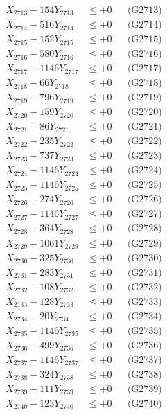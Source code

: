 \documentclass[a4paper,10pt]{article}
\begin{document}
{\begin{align}
X_{2713} - 154Y_{2713} &\leq +0 && \text{(G2713)} \\
X_{2714} - 516Y_{2714} &\leq +0 && \text{(G2714)} \\
X_{2715} - 152Y_{2715} &\leq +0 && \text{(G2715)} \\
X_{2716} - 580Y_{2716} &\leq +0 && \text{(G2716)} \\
X_{2717} - 1146Y_{2717} &\leq +0 && \text{(G2717)} \\
X_{2718} - 66Y_{2718} &\leq +0 && \text{(G2718)} \\
X_{2719} - 796Y_{2719} &\leq +0 && \text{(G2719)} \\
X_{2720} - 159Y_{2720} &\leq +0 && \text{(G2720)} \\
\allowbreak
X_{2721} - 86Y_{2721} &\leq +0 && \text{(G2721)} \\
X_{2722} - 235Y_{2722} &\leq +0 && \text{(G2722)} \\
X_{2723} - 737Y_{2723} &\leq +0 && \text{(G2723)} \\
X_{2724} - 1146Y_{2724} &\leq +0 && \text{(G2724)} \\
X_{2725} - 1146Y_{2725} &\leq +0 && \text{(G2725)} \\
X_{2726} - 274Y_{2726} &\leq +0 && \text{(G2726)} \\
X_{2727} - 1146Y_{2727} &\leq +0 && \text{(G2727)} \\
X_{2728} - 364Y_{2728} &\leq +0 && \text{(G2728)} \\
X_{2729} - 1061Y_{2729} &\leq +0 && \text{(G2729)} \\
X_{2730} - 325Y_{2730} &\leq +0 && \text{(G2730)} \\
\allowbreak
X_{2731} - 283Y_{2731} &\leq +0 && \text{(G2731)} \\
X_{2732} - 108Y_{2732} &\leq +0 && \text{(G2732)} \\
X_{2733} - 128Y_{2733} &\leq +0 && \text{(G2733)} \\
X_{2734} - 20Y_{2734} &\leq +0 && \text{(G2734)} \\
X_{2735} - 1146Y_{2735} &\leq +0 && \text{(G2735)} \\
X_{2736} - 499Y_{2736} &\leq +0 && \text{(G2736)} \\
X_{2737} - 1146Y_{2737} &\leq +0 && \text{(G2737)} \\
X_{2738} - 324Y_{2738} &\leq +0 && \text{(G2738)} \\
X_{2739} - 111Y_{2739} &\leq +0 && \text{(G2739)} \\
X_{2740} - 123Y_{2740} &\leq +0 && \text{(G2740)} \\

\end{align}}
\end{document}
